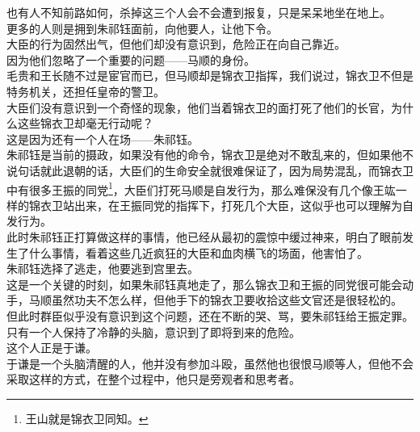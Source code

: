 \begin{multicols}{\theparacolNo}
也有人不知前路如何，杀掉这三个人会不会遭到报复，只是呆呆地坐在地上。\\

更多的人则是拥到朱祁钰面前，向他要人，让他下令。\\

大臣的行为固然出气，但他们却没有意识到，危险正在向自己靠近。\\

因为他们忽略了一个重要的问题——马顺的身份。\\

毛贵和王长随不过是宦官而已，但马顺却是锦衣卫指挥，我们说过，锦衣卫不但是特务机关，还担任皇帝的警卫。\\

大臣们没有意识到一个奇怪的现象，他们当着锦衣卫的面打死了他们的长官，为什么这些锦衣卫却毫无行动呢？\\

这是因为还有一个人在场——朱祁钰。\\

朱祁钰是当前的摄政，如果没有他的命令，锦衣卫是绝对不敢乱来的，但如果他不说句话就此退朝的话，大臣们的生命安全就很难保证了，因为局势混乱，而锦衣卫中有很多王振的同党\footnote{王山就是锦衣卫同知。}，大臣们打死马顺是自发行为，那么难保没有几个像王竑一样的锦衣卫站出来，在王振同党的指挥下，打死几个大臣，这似乎也可以理解为自发行为。\\

此时朱祁钰正打算做这样的事情，他已经从最初的震惊中缓过神来，明白了眼前发生了什么事情，看着这些几近疯狂的大臣和血肉横飞的场面，他害怕了。\\

朱祁钰选择了逃走，他要逃到宫里去。\\

这是一个关键的时刻，如果朱祁钰真地走了，那么锦衣卫和王振的同党很可能会动手，马顺虽然功夫不怎么样，但他手下的锦衣卫要收拾这些文官还是很轻松的。\\

但此时群臣似乎没有意识到这个问题，还在不断的哭、骂，要朱祁钰给王振定罪。\\

只有一个人保持了冷静的头脑，意识到了即将到来的危险。\\

这个人正是于谦。\\

于谦是一个头脑清醒的人，他并没有参加斗殴，虽然他也很恨马顺等人，但他不会采取这样的方式，在整个过程中，他只是旁观者和思考者。\\


\end{multicols}
